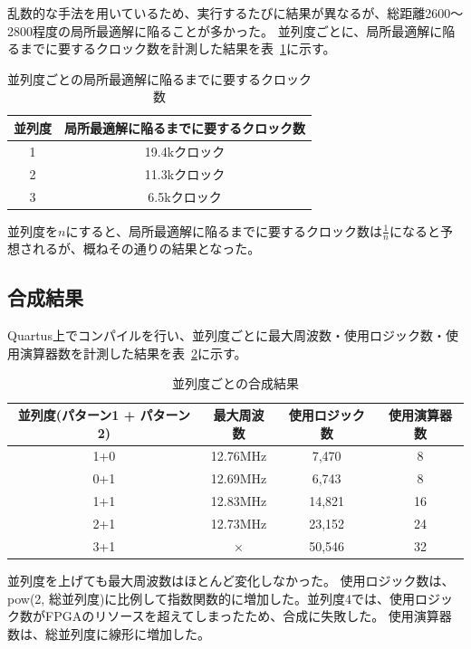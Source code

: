 乱数的な手法を用いているため、実行するたびに結果が異なるが、総距離2600～2800程度の局所最適解に陥ることが多かった。
並列度ごとに、局所最適解に陥るまでに要するクロック数を計測した結果を表~\ref{tab:time}に示す。
\begin{table}
    \label{tab:time}
    \begin{center}
        \caption{並列度ごとの局所最適解に陥るまでに要するクロック数}
        \begin{tabular}{|c|c|}
            \hline
            並列度 & 局所最適解に陥るまでに要するクロック数 \\ \hline
            1      & 19.4kクロック                     \\ \hline
            2      & 11.3kクロック                       \\ \hline
            3      & 6.5kクロック                       \\ \hline
        \end{tabular}
    \end{center}
\end{table}
並列度を$n$にすると、局所最適解に陥るまでに要するクロック数は$\frac{1}{n}$になると予想されるが、概ねその通りの結果となった。
\subsection*{合成結果}\label{sec:compile}
Quartus上でコンパイルを行い、並列度ごとに最大周波数・使用ロジック数・使用演算器数を計測した結果を表~\ref{tab:compile}に示す。
\begin{table}
    \label{tab:compile}
    \begin{center}
        \caption{並列度ごとの合成結果}
        \begin{tabular}{|c|c|c|c|}
            \hline
            並列度(パターン1 + パターン2) & 最大周波数 & 使用ロジック数 & 使用演算器数 \\ \hline
            1+0      & 12.76MHz    &  7,470          & 8       \\ \hline
            0+1      & 12.69MHz    &  6,743          & 8       \\ \hline
            1+1      & 12.83MHz    & 14,821          & 16       \\ \hline
            2+1      & 12.73MHz    & 23,152          & 24       \\ \hline
            3+1      & ×           & 50,546          & 32       \\ \hline
        \end{tabular}
    \end{center}
\end{table}
並列度を上げても最大周波数はほとんど変化しなかった。
使用ロジック数は、pow(2, 総並列度)に比例して指数関数的に増加した。並列度4では、使用ロジック数がFPGAのリソースを超えてしまったため、合成に失敗した。
使用演算器数は、総並列度に線形に増加した。

